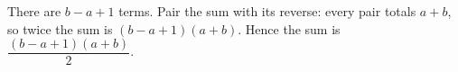 There are $b-a+1$ terms. Pair the sum with its reverse: every pair totals $a+b$, so twice the sum is $(b-a+1)(a+b)$. Hence the sum is $\boxed{\dfrac{(b-a+1)(a+b)}{2}}$.
